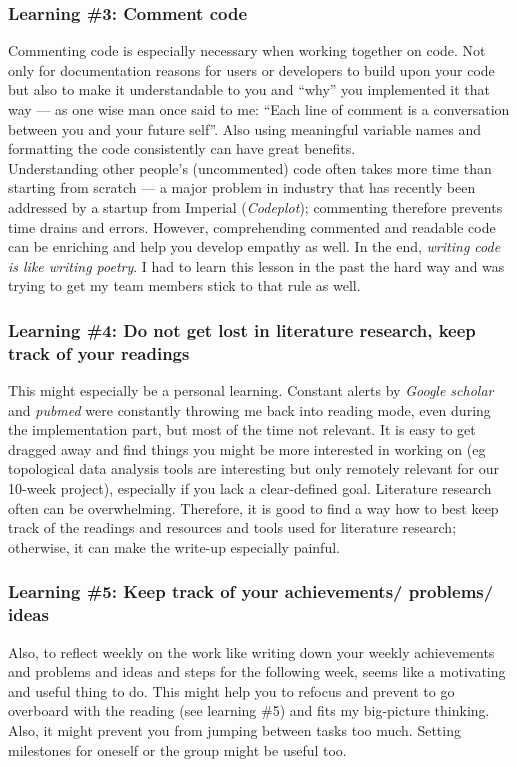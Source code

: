 \documentclass[journal, a4paper]{IEEEtran}
\begin{document}
\hfill
\subsubsection{Learning \#3: Comment code}
Commenting code is especially necessary when working together on code. Not only for documentation reasons for users or developers to build upon your code but also to make it understandable to you and “why” you implemented it that way — as one wise man once said to me: “Each line of comment is a conversation between you and your future self”. Also using meaningful variable names and formatting the code consistently can have great benefits.\\
Understanding other people’s (uncommented) code often takes more time than starting from scratch — a major problem in industry that has recently been addressed by a startup from Imperial (\textit{Codeplot}); commenting therefore prevents time drains and errors. However, comprehending commented and readable code can be enriching and help you develop empathy as well. In the end, \textit{writing code is like writing poetry}. 
I had to learn this lesson in the past the hard way
and was trying to get my team members stick to that rule as well. 


\hfill
\subsubsection{Learning \#4: Do not get lost in literature research, keep track of your readings}
This might especially be a personal learning. Constant alerts by \textit{Google scholar} and \textit{pubmed} were constantly throwing me back into reading mode, even during the implementation part, but most of the time not relevant. It is easy to get dragged away and find things you might be more interested in working on (eg topological data analysis tools are interesting but only remotely relevant for our 10-week project), especially if you lack a clear-defined goal. Literature research often can be overwhelming. Therefore, it is good to find a way how to best keep track of the readings and resources and tools used for literature research; otherwise, it can make the write-up especially painful. %

\hfill
\subsubsection{Learning \#5: Keep track of your achievements/ problems/ ideas}
Also, to reflect weekly on the work like writing down your weekly achievements and problems and ideas and steps for the following week, seems like a motivating and useful thing to do. This might help you to refocus and prevent to go overboard with the reading (see learning \#5) and fits my big-picture thinking. Also, it might prevent you from jumping between tasks too much. Setting milestones for oneself or the group might be useful too. 
\end{document}
